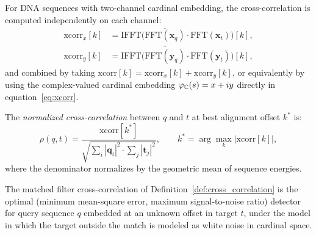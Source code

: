 \begin{remark}
For DNA sequences with two-channel cardinal embedding, the cross-correlation
is computed independently on each channel:
\begin{align}
  \mathrm{xcorr}_x[k] &= \mathrm{IFFT}\bigl(\overline{\mathrm{FFT}(\mathbf{x}_q)} \cdot \mathrm{FFT}(\mathbf{x}_t)\bigr)[k], \\
  \mathrm{xcorr}_y[k] &= \mathrm{IFFT}\bigl(\overline{\mathrm{FFT}(\mathbf{y}_q)} \cdot \mathrm{FFT}(\mathbf{y}_t)\bigr)[k],
\end{align}
and combined by taking $\mathrm{xcorr}[k] = \mathrm{xcorr}_x[k] + \mathrm{xcorr}_y[k]$,
or equivalently by using the complex-valued cardinal embedding
$\varphi_\mathbb{C}(s) = x + iy$ directly in equation~\eqref{eq:xcorr}.
\end{remark}

\begin{definition}
\label{def:normalized_xcorr}
The \emph{normalized cross-correlation} between $q$ and $t$ at best alignment
offset $k^*$ is:
\begin{equation}
  \rho(q, t) = \frac{\mathrm{xcorr}[k^*]}{\sqrt{\sum_i |\mathbf{q}_i|^2 \cdot \sum_j |\mathbf{t}_j|^2}},
  \qquad k^* = \arg\max_k |\mathrm{xcorr}[k]|,
  \label{eq:normalized_xcorr}
\end{equation}
where the denominator normalizes by the geometric mean of sequence energies.
\end{definition}

\begin{theorem}
\label{thm:matched_filter}
The matched filter cross-correlation of Definition~\ref{def:cross_correlation}
is the optimal (minimum mean-square error, maximum signal-to-noise ratio)
detector for query sequence $q$ embedded at an unknown offset in target $t$,
under the model in which the target outside the match is modeled as
white noise in cardinal space.
\end{theorem}

